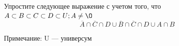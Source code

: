 \question
Упростите следующее выражение с учетом того, что $A\subset B \subset C \subset D \subset U; A \neq \O$
\begin{equation*}
\overline{A} \cap \overline{C} \cap D \cup \overline{B} \cap \overline{C} \cap D \cup A \cap B
\end{equation*}

Примечание: U — универсум